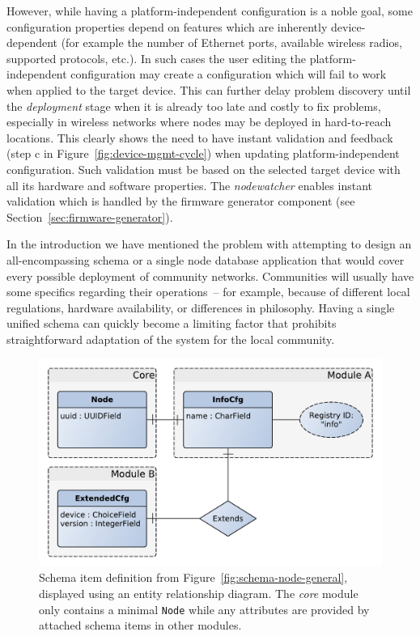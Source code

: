 \documentclass[5p,sort&compress]{elsarticle}
\newcommand{\nodewatcher}{\textit{nodewatcher}}
\begin{document}
However, while having a platform-independent configuration is a noble goal, some configuration properties depend on features which are inherently device-dependent (for example the number of Ethernet ports, available wireless radios, supported protocols, etc.).
In such cases the user editing the platform-independent configuration may create a configuration which will fail to work when applied to the target device.
This can further delay problem discovery until the \textit{deployment} stage when it is already too late and costly to fix problems, especially in wireless networks where nodes may be deployed in hard-to-reach locations.
This clearly shows the need to have instant validation and feedback (step c in Figure~\ref{fig:device-mgmt-cycle}) when updating platform-independent configuration.
Such validation must be based on the selected target device with all its hardware and software properties.
The \nodewatcher{} enables instant validation which is handled by the firmware generator component (see Section~\ref{sec:firmware-generator}).

In the introduction we have mentioned the problem with attempting to design an all-encompassing schema or a single node database application that would cover every possible deployment of community networks.
Communities will usually have some specifics regarding their operations~-- for example, because of different local regulations, hardware availability, or differences in philosophy.
Having a single unified schema can quickly become a limiting factor that prohibits straightforward adaptation of the system for the local community.

\begin{figure}
  \centering
  \includegraphics[scale=0.47]{figures/registry-example-models.pdf}
  \caption{Schema item definition from Figure~\ref{fig:schema-node-general}, displayed using an entity relationship diagram.
  The \textit{core} module only contains a minimal \texttt{Node} while any attributes are provided by attached schema items in other modules.}
  \label{fig:registry-schema-example}
\end{figure}
\end{document}
